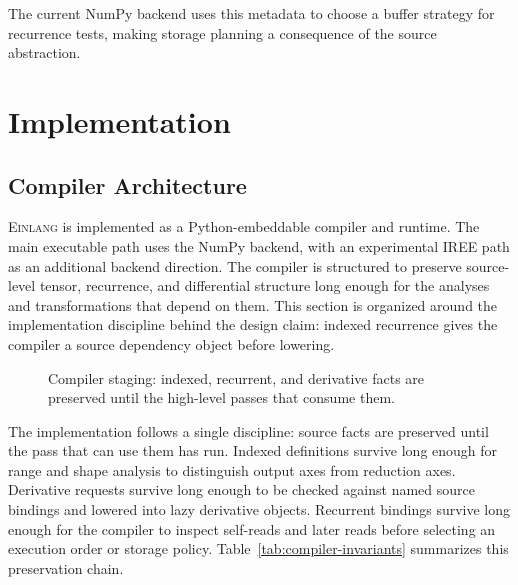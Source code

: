 \documentclass[sigplan,screen,nonacm]{acmart}
\newcommand{\einlang}{\textsc{Einlang}}
\begin{document}
The current NumPy backend uses this metadata to choose a buffer strategy for recurrence tests, making storage planning a consequence of the source abstraction.

\section{Implementation}

\subsection{Compiler Architecture}

\einlang{} is implemented as a Python-embeddable compiler and runtime. The main executable path uses the NumPy backend, with an experimental IREE path as an additional backend direction. The compiler is structured to preserve source-level tensor, recurrence, and differential structure long enough for the analyses and transformations that depend on them. This section is organized around the implementation discipline behind the design claim: indexed recurrence gives the compiler a source dependency object before lowering.

\begin{figure}[t]
\centering
\resizebox{0.88\textwidth}{!}{}
\vspace{-0.35em}
\captionsetup{hypcap=false}
\caption{Compiler staging: indexed, recurrent, and derivative facts are preserved until the high-level passes that consume them.}
\label{fig:pipeline}
\vspace{-0.4em}
\end{figure}

The implementation follows a single discipline: source facts are preserved until the pass that can use them has run. Indexed definitions survive long enough for range and shape analysis to distinguish output axes from reduction axes. Derivative requests survive long enough to be checked against named source bindings and lowered into lazy derivative objects. Recurrent bindings survive long enough for the compiler to inspect self-reads and later reads before selecting an execution order or storage policy. Table~\ref{tab:compiler-invariants} summarizes this preservation chain.
\end{document}

